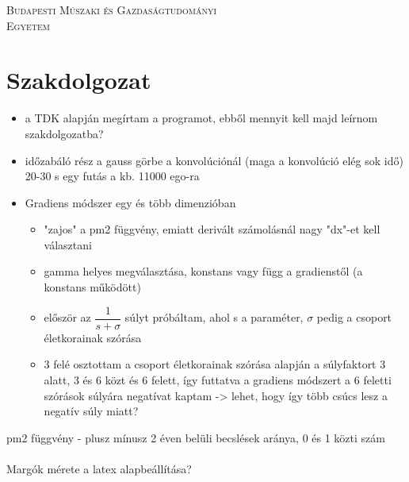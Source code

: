 \documentclass[12pt]{article}
\title{}
\date{}
\begin{document}
\begin{titlepage}
	\centering
	{\scshape\LARGE Budapesti Műszaki és Gazdaságtudományi\\Egyetem \par}

\end{titlepage}

\onehalfspacing
\section*{Szakdolgozat}
\begin{itemize}
	\item a TDK alapján megírtam a programot, ebből mennyit kell majd leírnom szakdolgozatba?
	\item időzabáló rész a gauss görbe a konvolúciónál (maga a konvolúció elég sok idő) 20-30 s egy futás a kb. 11000 ego-ra
	\item Gradiens módszer egy és több dimenzióban
	\begin{itemize}
		\item "zajos" a pm2 függvény, emiatt derivált számolásnál nagy "dx"-et kell választani
		\item gamma helyes megválasztása, konstans vagy függ a gradienstől (a konstans működött)
		\item először az $\dfrac{1}{s + \sigma}$ súlyt próbáltam, ahol s a paraméter, $\sigma$ pedig a csoport életkorainak szórása
		\item 3 felé osztottam a csoport életkorainak szórása alapján a súlyfaktort 3 alatt, 3 és 6 közt és 6 felett, így futtatva a gradiens módszert a 6 feletti szórások súlyára negatívat kaptam -> lehet, hogy így több csúcs lesz a negatív súly miatt?
	\end{itemize}
\end{itemize}
pm2 függvény - plusz mínusz 2 éven belüli becslések aránya, 0 és 1 közti szám \\ \\
Margók mérete a latex alapbeállítása?
\end{document}
